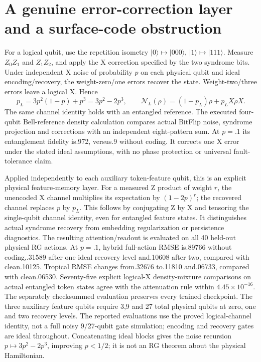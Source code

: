 \section{A genuine error-correction layer and a surface-code obstruction}
For a logical qubit, use the repetition isometry
$|0\rangle\mapsto|000\rangle $, $|1\rangle\mapsto|111\rangle $.
Measure $ Z_0 Z_1$ and $ Z_1 Z_2$, and apply the X correction specified by the
two syndrome bits. Under independent X noise of probability $ p $ on each
physical qubit and ideal encoding/recovery, the weight-zero/one errors
recover the state. Weight-two/three errors leave a logical X. Hence
\[
 p_L=3 p^2(1-p)+p^3=3 p^2-2 p^3,
 \qquad\mathcal N_L(\rho)=(1-p_L)\rho+p_LX\rho X.
\]
The same channel identity holds with an entangled reference. The executed
four-qubit Bell-reference density calculation compares actual BitFlip noise,
syndrome projection and corrections with an independent eight-pattern sum.
At $ p=.1$ its entanglement fidelity is.972, versus.9 without coding.
It corrects one X error under the stated ideal assumptions, with no phase
protection or universal fault-tolerance claim.

Applied independently to each auxiliary token-feature qubit, this is an
explicit physical feature-memory layer. For a measured Z product of weight
$ r $, the unencoded X channel multiplies its expectation by $(1-2 p)^r $;
the recovered channel replaces $ p $ by $ p_L $. This follows by conjugating Z
by X and tensoring the single-qubit channel identity, even for entangled
feature states. It distinguishes actual syndrome recovery from embedding
regularization or persistence diagnostics. The resulting attention/readout
is evaluated on all 40 held-out physical RG actions. At $ p=.1$, hybrid
full-action RMSE is.89766 without coding,.31589 after one ideal recovery
level and.10608 after two, compared with clean.10125. Tropical RMSE changes
from.32676 to.11810 and.06733, compared with clean.06530. Seventy-five
explicit logical-X density-mixture comparisons on actual entangled token
states agree with the attenuation rule within $4.45\times 10^{-16}$. The
separately checksummed evaluation preserves every trained checkpoint.
The three auxiliary feature qubits require 3,9 and 27 total physical qubits
at zero, one and two recovery levels. The reported evaluations use the
proved logical-channel identity, not a full noisy 9/27-qubit gate simulation;
encoding and recovery gates are ideal throughout.
Concatenating ideal
blocks gives the noise recursion $ p\mapsto 3 p^2-2 p^3$, improving $ p<1/2$;
it is not an RG theorem about the physical Hamiltonian.


